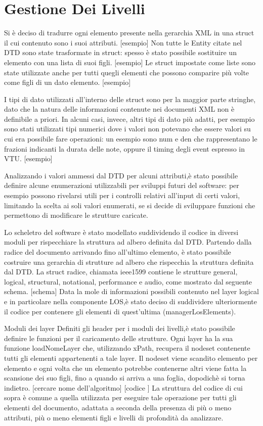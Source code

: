\documentclass[12pt,italian]{report}
\begin{document}
\section{Gestione Dei Livelli}
\label{subsec:gestionedeilivelli}

Si \`e deciso di tradurre ogni elemento presente nella gerarchia XML in una struct il cui contenuto sono i suoi attributi. [esempio]
Non tutte le Entity citate nel DTD sono state trasformate in struct: spesso \`e stato possibile sostituire un elemento con una lista di suoi figli. [esempio] 
Le struct impostate come liste sono state utilizzate anche per tutti quegli elementi che possono comparire pi\`u volte come figli di un dato elemento. [esempio]

I tipi di dato utilizzati all’interno delle struct sono per la maggior parte stringhe, dato che la natura delle informazioni contenute nei documenti XML non \`e definibile a priori. In alcuni casi, invece, altri tipi di dato pi\`u adatti, per esempio sono stati utilizzati tipi numerici dove i valori non potevano che essere valori su cui era possibile fare operazioni: un esempio sono num e den che rappresentano le frazioni indicanti la durata delle note, oppure il timing degli event espresso in VTU. [esempio]

Analizzando i valori ammessi dal DTD per alcuni attributi,\`e stato possibile definire alcune enumerazioni utilizzabili per sviluppi futuri del software: per esempio possono rivelarsi utili per i controlli relativi all’input di certi valori, limitando la scelta ai soli valori enumerati, se si decide di sviluppare funzioni che permettono di modificare le strutture caricate.

Lo scheletro del software \`e stato modellato suddividendo il codice in diversi moduli per rispecchiare la struttura ad albero definita dal DTD. 
Partendo dalla radice del documento arrivando fino all’ultimo elemento, \`e stato possibile costruire una gerarchia di strutture ad albero che rispecchia la struttura definita dal DTD. La struct radice, chiamata ieee1599 contiene le strutture general, logical, structural, notational, performance e audio, come mostrato dal seguente schema. [schema]
Data la mole di informazioni possibili contenuto nel layer logical e in particolare nella componente LOS,\`e stato deciso di suddividere ulteriormente il codice per contenere gli elementi di 
quest’ultima (managerLosElements).


Moduli dei layer
Definiti gli header per i moduli dei livelli,\`e stato possibile definire le funzioni per il caricamento delle strutture. Ogni layer ha la sua funzione loadNomeLayer che, utilizzando xPath, recupera il nodeset contenente tutti gli elementi appartenenti a tale layer. 
Il nodeset viene scandito elemento per elemento e ogni volta che un elemento potrebbe contenerne altri viene fatta la scansione dei suo figli, fino a quando si arriva a una foglia, dopodich\`e si torna indietro. [cercare nome dell’algoritmo] 
[codice ]
La struttura del codice di cui sopra \`e comune a quella utilizzata per eseguire tale operazione per tutti gli elementi del documento, adattata a seconda della presenza di pi\`u o meno attributi, pi\`u o meno elementi figli e livelli di profondit\`a da analizzare.
\end{document}
